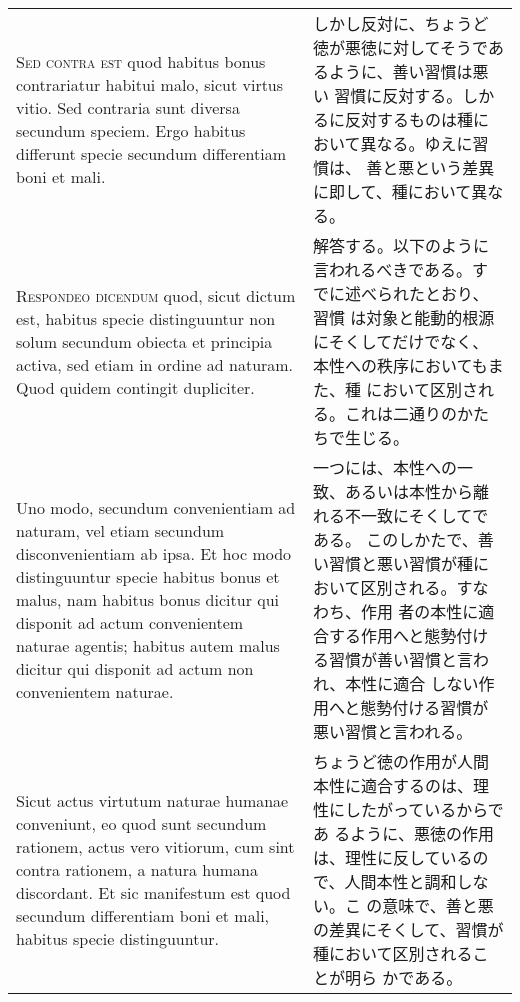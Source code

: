 \documentclass[10pt]{jsarticle} %
\begin{document}
\begin{longtable}{p{21em}p{21em}}
{\scshape Sed contra est} quod habitus bonus contrariatur habitui
malo, sicut virtus vitio. Sed contraria sunt diversa secundum
speciem. Ergo habitus differunt specie secundum differentiam boni et
mali.

&

しかし反対に、ちょうど徳が悪徳に対してそうであるように、善い習慣は悪い
習慣に反対する。しかるに反対するものは種において異なる。ゆえに習慣は、
善と悪という差異に即して、種において異なる。


\\



{\scshape Respondeo dicendum} quod, sicut dictum est, habitus specie
distinguuntur non solum secundum obiecta et principia activa, sed
etiam in ordine ad naturam. Quod quidem contingit dupliciter.


&

解答する。以下のように言われるべきである。すでに述べられたとおり、習慣
は対象と能動的根源にそくしてだけでなく、本性への秩序においてもまた、種
において区別される。これは二通りのかたちで生じる。

\\

Uno modo, secundum convenientiam ad naturam, vel etiam secundum
disconvenientiam ab ipsa. Et hoc modo distinguuntur specie habitus
bonus et malus, nam habitus bonus dicitur qui disponit ad actum
convenientem naturae agentis; habitus autem malus dicitur qui disponit
ad actum non convenientem naturae.



&

一つには、本性への一致、あるいは本性から離れる不一致にそくしてである。
このしかたで、善い習慣と悪い習慣が種において区別される。すなわち、作用
者の本性に適合する作用へと態勢付ける習慣が善い習慣と言われ、本性に適合
しない作用へと態勢付ける習慣が悪い習慣と言われる。


\\


Sicut actus virtutum naturae humanae conveniunt, eo quod sunt secundum
rationem, actus vero vitiorum, cum sint contra rationem, a natura
humana discordant. Et sic manifestum est quod secundum differentiam
boni et mali, habitus specie distinguuntur.


&

ちょうど徳の作用が人間本性に適合するのは、理性にしたがっているからであ
るように、悪徳の作用は、理性に反しているので、人間本性と調和しない。こ
の意味で、善と悪の差異にそくして、習慣が種において区別されることが明ら
かである。


\end{longtable}
\end{document}
